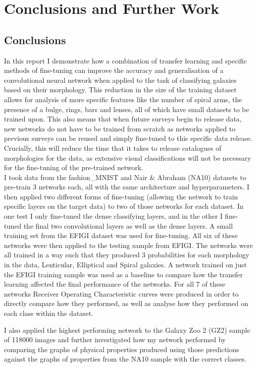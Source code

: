 \documentclass[12pt, onecolumn]{aa}
\begin{document}
\section{Conclusions and Further Work} \label{sec:conc}
\subsection{Conclusions}
In this report I demonstrate how a combination of transfer learning and specific methods of fine-tuning can improve the accuracy and generalisation of a convolutional neural network when applied to the task of classifying galaxies based on their morphology. This reduction in the size of the training dataset allows for analysis of more specific features like the number of spiral arms, the presence of a bulge, rings, bars and lenses, all of which have small datasets to be trained upon. This also means that when future surveys begin to release data, new networks do not have to be trained from scratch as networks applied to previous surveys can be reused and simply fine-tuned to this specific data release. Crucially, this will reduce the time that it takes to release catalogues of morphologies for the data, as extensive visual classifications will not be necessary for the fine-tuning of the pre-trained network. \\

I took data from the fashion\_MNIST and Nair \& Abraham (NA10) datasets to pre-train 3 networks each, all with the same architecture and hyperparameters. I then applied two different forms of fine-tuning (allowing the network to train specific layers on the target data) to two of those networks for each dataset. In one test I only fine-tuned the dense classifying layers, and in the other I fine-tuned the final two convolutional layers as well as the dense layers. A small training set from the EFIGI dataset was used for fine-tuning. All six of these networks were then applied to the testing sample from EFIGI. The networks were all trained in a way such that they produced 3 probabilities for each morphology in the data, Lenticular, Elliptical and Spiral galaxies.  A network trained on just the EFIGI training sample was used as a baseline to compare how the transfer learning affected the final performance of the networks. For all 7 of these networks Receiver Operating Characteristic curves were produced in order to directly compare how they performed, as well as analyse how they performed on each class within the dataset. 

I also applied the highest performing network to the Galaxy Zoo 2 (GZ2) sample of 118000 images and further investigated how my network performed by comparing the graphs of physical properties produced using those predictions against the graphs of properties from the NA10 sample with the correct classes. \\
\end{document}
